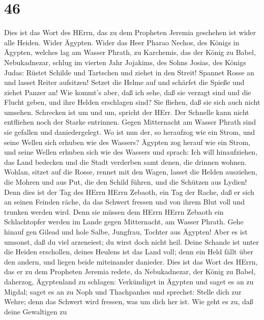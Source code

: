 \hypertarget{section-45}{%
\section{46}\label{section-45}}

 Dies ist das Wort des HErrn, das zu dem Propheten Jeremia
geschehen ist wider alle Heiden.  Wider Ägypten. Wider das
Heer Pharao Nechos, des Königs in Ägypten, welches lag am Wasser Phrath,
zu Karchemis, das der König zu Babel, Nebukadnezar, schlug im vierten
Jahr Jojakims, des Sohns Josias, des Königs Judas:  Rüstet
Schilde und Tartschen und ziehet in den Streit!  Spannet
Rosse an und lasset Reiter aufsitzen! Setzet die Helme auf und schärfet
die Spieße und ziehet Panzer an!  Wie kommt's aber, daß ich
sehe, daß sie verzagt sind und die Flucht geben, und ihre Helden
erschlagen sind? Sie fliehen, daß sie sich auch nicht umsehen. Schrecken
ist um und um, spricht der HErr.  Der Schnelle kann nicht
entfliehen noch der Starke entrinnen. Gegen Mitternacht am Wasser Phrath
sind sie gefallen und daniedergelegt.  Wo ist nun der, so
heraufzog wie ein Strom, und seine Wellen sich erhuben wie des Wassers?
 Ägypten zog herauf wie ein Strom, und seine Wellen erhuben
sich wie des Wassers und sprach: Ich will hinaufziehen, das Land
bedecken und die Stadt verderben samt denen, die drinnen wohnen.
 Wohlan, sitzet auf die Rosse, rennet mit den Wagen, lasset
die Helden ausziehen, die Mohren und aus Put, die den Schild führen, und
die Schützen aus Lydien!  Denn dies ist der Tag des HErrn
HErrn Zebaoth, ein Tag der Rache, daß er sich an seinen Feinden räche,
da das Schwert fressen und von ihrem Blut voll und trunken werden wird.
Denn sie müssen dem HErrn HErrn Zebaoth ein Schlachtopfer werden im
Lande gegen Mitternacht, am Wasser Phrath.  Gehe hinauf gen
Gilead und hole Salbe, Jungfrau, Tochter aus Ägypten! Aber es ist
umsonst, daß du viel arzeneiest; du wirst doch nicht heil. 
Deine Schande ist unter die Heiden erschollen, deines Heulens ist das
Land voll; denn ein Held fällt über den andern, und liegen beide
miteinander danieder.  Dies ist das Wort des HErrn, das er
zu dem Propheten Jeremia redete, da Nebukadnezar, der König zu Babel,
daherzog, Ägyptenland zu schlagen:  Verkündiget in Ägypten
und saget es an zu Migdal; saget es an zu Noph und Thachpanhes und
sprechet: Stelle dich zur Wehre; denn das Schwert wird fressen, was um
dich her ist.  Wie geht es zu, daß deine Gewaltigen zu
